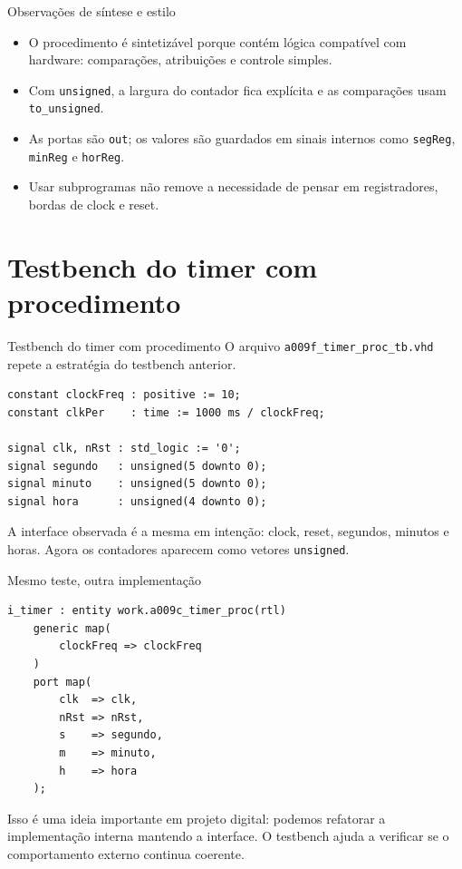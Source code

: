 \documentclass[aspectratio=169,11pt]{beamer}
\begin{document}
\begin{frame}{Observações de síntese e estilo}
    \begin{itemize}
        \item O procedimento é sintetizável porque contém lógica compatível com hardware: comparações, atribuições e controle simples.
        \item Com \texttt{unsigned}, a largura do contador fica explícita e as comparações usam \texttt{to\_unsigned}.
        \item As portas são \texttt{out}; os valores são guardados em sinais internos como \texttt{segReg}, \texttt{minReg} e \texttt{horReg}.
        \item Usar subprogramas não remove a necessidade de pensar em registradores, bordas de clock e reset.
    \end{itemize}

\end{frame}

\section{Testbench do timer com procedimento}

\begin{frame}[fragile]{Testbench do timer com procedimento}
    O arquivo \texttt{a009f\_timer\_proc\_tb.vhd} repete a estratégia do testbench anterior.

\begin{lstlisting}
constant clockFreq : positive := 10;
constant clkPer    : time := 1000 ms / clockFreq;

signal clk, nRst : std_logic := '0';
signal segundo   : unsigned(5 downto 0);
signal minuto    : unsigned(5 downto 0);
signal hora      : unsigned(4 downto 0);
\end{lstlisting}

    \vspace{0.4em}
    A interface observada é a mesma em intenção: clock, reset, segundos, minutos e horas. Agora os contadores aparecem como vetores \texttt{unsigned}.
\end{frame}

\begin{frame}[fragile]{Mesmo teste, outra implementação}
\begin{lstlisting}
i_timer : entity work.a009c_timer_proc(rtl)
    generic map(
        clockFreq => clockFreq
    )
    port map(
        clk  => clk,
        nRst => nRst,
        s    => segundo,
        m    => minuto,
        h    => hora
    );
\end{lstlisting}

    \vspace{0.5em}
    Isso é uma ideia importante em projeto digital: podemos refatorar a implementação interna mantendo a interface. O testbench ajuda a verificar se o comportamento externo continua coerente.
\end{frame}
\end{document}
